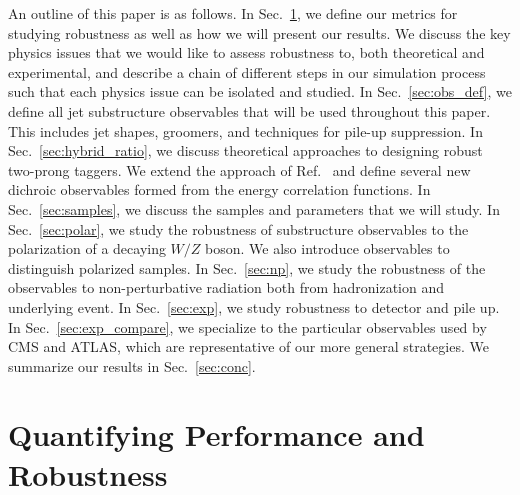 \documentclass[11pt,letterpaper]{article}
\DeclareRobustCommand{\Sec}[1]{Sec.~\ref{#1}}
\DeclareRobustCommand{\Ref}[1]{Ref.~\cite{#1}}
\begin{document}
%





%
%
%
%
%
%
%


An outline of this paper is as follows.
%
In \Sec{sec:pres}, we define our metrics for studying robustness as well as how we will present our results.
%
We discuss the key physics issues that we would like to assess robustness to, both theoretical and experimental, and describe a chain of different steps in our simulation process such that each physics issue can be isolated and studied.
%
In \Sec{sec:obs_def}, we define all jet substructure observables that will be used throughout this paper.
%
This includes jet shapes, groomers, and techniques for pile-up suppression.
%
In \Sec{sec:hybrid_ratio}, we discuss theoretical approaches to designing robust two-prong taggers.
%
We extend the approach of \Ref{Salam:2016yht} and define several new dichroic observables formed from the energy correlation functions.  
%
In \Sec{sec:samples}, we discuss the samples and parameters that we will study.
%
In \Sec{sec:polar}, we study the robustness of substructure observables to the polarization of a decaying $W/Z$ boson.
%
We also introduce observables to distinguish polarized samples.
%
In \Sec{sec:np}, we study the robustness of the observables to non-perturbative radiation both from hadronization and underlying event.
%
In \Sec{sec:exp}, we study robustness to detector and pile up.
%
In \Sec{sec:exp_compare}, we specialize to the particular observables used by CMS and ATLAS, which are representative of our more general strategies.
%
We summarize our results in \Sec{sec:conc}.

\section{Quantifying Performance and Robustness}\label{sec:pres}
\end{document}
